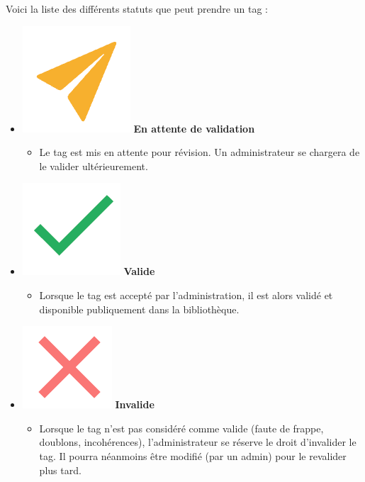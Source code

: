Voici la liste des différents statuts que peut prendre un \gls{tag} :

\begin{itemize}
    \item \includegraphics[valign=b,height=1.4\fontcharht\font`X]{images/client/pending.png} \textbf{En attente de validation}
    \begin{itemize}
        \item Le \gls{tag} est mis en attente pour révision. Un administrateur se chargera de le valider ultérieurement.
    \end{itemize}
    \item \includegraphics[valign=b,height=1.4\fontcharht\font`X]{images/client/validated.png} \textbf{Valide}
    \begin{itemize}
        \item Lorsque le \gls{tag} est accepté par l'administration, il est alors validé et disponible publiquement dans la bibliothèque.
    \end{itemize} 
    \item \includegraphics[valign=b,height=1.4\fontcharht\font`X]{images/client/not-validated.png} \textbf{Invalide}
    \begin{itemize}
        \item Lorsque le \gls{tag} n'est pas considéré comme valide (faute de frappe, doublons, incohérences), l'administrateur se réserve le droit d'invalider le tag. Il pourra néanmoins être modifié (par un admin) pour le revalider plus tard.

\end{itemize}
\end{itemize}

